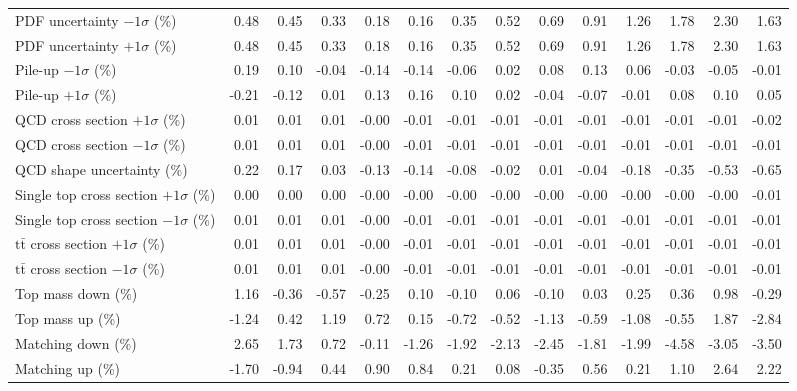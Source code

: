\begin{table}[htbp]
{\begin{tabular}{lrrrrrrrrrrrrr}
PDF uncertainty $-1\sigma$ (\%) & 0.48 & 0.45 & 0.33 & 0.18 & 0.16 & 0.35 & 0.52 & 0.69 & 0.91 & 1.26 & 1.78 & 2.30 & 1.63 \\ 
PDF uncertainty $+1\sigma$ (\%) & 0.48 & 0.45 & 0.33 & 0.18 & 0.16 & 0.35 & 0.52 & 0.69 & 0.91 & 1.26 & 1.78 & 2.30 & 1.63 \\ 
Pile-up $-1\sigma$ (\%) & 0.19 & 0.10 & -0.04 & -0.14 & -0.14 & -0.06 & 0.02 & 0.08 & 0.13 & 0.06 & -0.03 & -0.05 & -0.01 \\ 
Pile-up $+1\sigma$ (\%) & -0.21 & -0.12 & 0.01 & 0.13 & 0.16 & 0.10 & 0.02 & -0.04 & -0.07 & -0.01 & 0.08 & 0.10 & 0.05 \\ 
QCD cross section \ensuremath{+1\sigma} (\%) & 0.01 & 0.01 & 0.01 & -0.00 & -0.01 & -0.01 & -0.01 & -0.01 & -0.01 & -0.01 & -0.01 & -0.01 & -0.02 \\ 
QCD cross section \ensuremath{-1\sigma} (\%) & 0.01 & 0.01 & 0.01 & -0.00 & -0.01 & -0.01 & -0.01 & -0.01 & -0.01 & -0.01 & -0.01 & -0.01 & -0.01 \\ 
QCD shape uncertainty (\%) & 0.22 & 0.17 & 0.03 & -0.13 & -0.14 & -0.08 & -0.02 & 0.01 & -0.04 & -0.18 & -0.35 & -0.53 & -0.65 \\ 
Single top cross section $+1\sigma$ (\%) & 0.00 & 0.00 & 0.00 & -0.00 & -0.00 & -0.00 & -0.00 & -0.00 & -0.00 & -0.00 & -0.00 & -0.00 & -0.01 \\ 
Single top cross section $-1\sigma$ (\%) & 0.01 & 0.01 & 0.01 & -0.00 & -0.01 & -0.01 & -0.01 & -0.01 & -0.01 & -0.01 & -0.01 & -0.01 & -0.01 \\ 
$\mathrm{t}\bar{\mathrm{t}}$ cross section $+1\sigma$ (\%) & 0.01 & 0.01 & 0.01 & -0.00 & -0.01 & -0.01 & -0.01 & -0.01 & -0.01 & -0.01 & -0.01 & -0.01 & -0.01 \\ 
$\mathrm{t}\bar{\mathrm{t}}$ cross section $-1\sigma$ (\%) & 0.01 & 0.01 & 0.01 & -0.00 & -0.01 & -0.01 & -0.01 & -0.01 & -0.01 & -0.01 & -0.01 & -0.01 & -0.01 \\ 
Top mass down (\%) & 1.16 & -0.36 & -0.57 & -0.25 & 0.10 & -0.10 & 0.06 & -0.10 & 0.03 & 0.25 & 0.36 & 0.98 & -0.29 \\ 
Top mass up (\%) & -1.24 & 0.42 & 1.19 & 0.72 & 0.15 & -0.72 & -0.52 & -1.13 & -0.59 & -1.08 & -0.55 & 1.87 & -2.84 \\ 
Matching down (\%) & 2.65 & 1.73 & 0.72 & -0.11 & -1.26 & -1.92 & -2.13 & -2.45 & -1.81 & -1.99 & -4.58 & -3.05 & -3.50 \\ 
Matching up (\%) & -1.70 & -0.94 & 0.44 & 0.90 & 0.84 & 0.21 & 0.08 & -0.35 & 0.56 & 0.21 & 1.10 & 2.64 & 2.22 \\ 

\end{tabular}}
\end{table}
